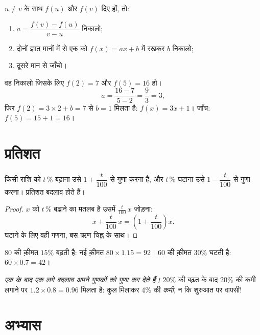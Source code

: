 \begin{method}\label{met:g9:linfunc:findaffine}
$u \neq v$ के साथ $f(u)$ और $f(v)$ दिए हों, तो:
\begin{enumerate}
  \item {} $a = \dfrac{f(v) - f(u)}{v - u}$ निकालो;
  \item दोनों ज्ञात मानों में से एक को $f(x) = ax + b$ में रखकर $b$
        निकालो;
  \item दूसरे मान से जाँचो।
\end{enumerate}
\end{method}

\begin{example}\label{ex:g9:linfunc:findaffine}
वह  निकालो जिसके लिए $f(2) = 7$ और $f(5) = 16$ हो।
\[
a = \frac{16 - 7}{5 - 2} = \frac93 = 3 ,
\]
फिर $f(2) = 3 \times 2 + b = 7$ से $b = 1$ मिलता है: $f(x) = 3x + 1$।
जाँच: $f(5) = 15 + 1 = 16$।
\end{example}

\section{प्रतिशत}

\begin{proposition}[प्रतिशत बदलाव]\label{prop:g9:linfunc:percent}
किसी राशि को $t\,\%$ बढ़ाना उसे $1 + \dfrac{t}{100}$ से गुणा करना है,
और $t\,\%$ घटाना उसे $1 - \dfrac{t}{100}$ से गुणा करना। प्रतिशत बदलाव
 होते हैं।
\end{proposition}

\begin{proof}
$x$ को $t\,\%$ बढ़ाने का मतलब है उसमें $\frac{t}{100}\,x$ जोड़ना:
\[
x + \frac{t}{100}\,x = \left(1 + \frac{t}{100}\right) x .
\]
घटाने के लिए वही गणना, बस ऋण चिह्न के साथ।
\end{proof}

\begin{example}\label{ex:g9:linfunc:percent}
$80$ की क़ीमत $15\%$ बढ़ती है: नई क़ीमत
$80 \times 1.15 = 92$। $60$ की क़ीमत $30\%$ घटती है:
$60 \times 0.7 = 42$।

\emph{एक के बाद एक लगे बदलाव अपने गुणकों को गुणा कर देते हैं।}
$20\%$ की बढ़त के बाद $20\%$ की कमी लगाने पर
$1.2 \times 0.8 = 0.96$ मिलता है: कुल मिलाकर $4\%$ की \emph{कमी}, न
कि शुरुआत पर वापसी!
\end{example}

\section{अभ्यास}

